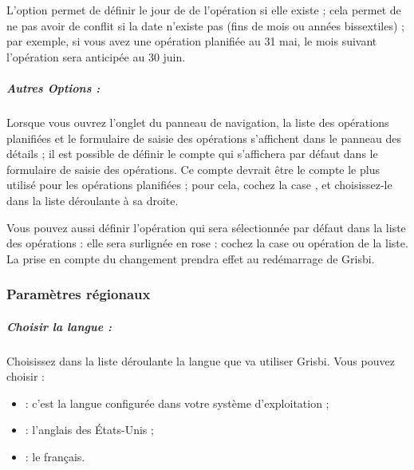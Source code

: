 	
L'option  permet de définir le jour de de l'opération si elle existe ; cela permet de ne pas avoir de conflit si la date n'existe pas (fins de mois ou années bissextiles) ; par exemple, si vous avez une opération planifiée au 31 mai, le mois suivant l'opération sera anticipée au 30 juin.


\ifIllustration
\fi



\ifIllustration
\fi
%
%



\subparagraph{Autres Options :\label{setup-general-various-planned-otherOptions}}

Lorsque vous ouvrez l'onglet  du panneau de navigation, la liste des opérations planifiées et le formulaire de saisie des opérations  s'affichent dans le panneau des détails ; il est possible de définir le compte qui s'affichera par défaut dans le formulaire de saisie des opérations. Ce compte devrait être le compte le plus utilisé pour les opérations planifiées ; pour cela, cochez la case , et choisissez-le dans la liste déroulante à sa droite.


Vous pouvez aussi définir l’opération qui sera sélectionnée par défaut dans la liste des opérations : elle sera surlignée en rose{\couleur} : cochez la case  ou  opération de la liste. La prise en compte du changement prendra effet au redémarrage de Grisbi.



\subsubsection{Paramètres régionaux\label{setup-general-various-regional}}


\subparagraph{Choisir la langue :}\label{setup-general-various-regional-langue} Choisissez dans la liste déroulante la langue que va utiliser Grisbi. Vous pouvez choisir :

\begin{itemize}
	\item {} : c'est la langue configurée dans votre système d'exploitation ;
	\item {} : l'anglais des États-Unis ;
	\item {} : le français.
\end{itemize}



